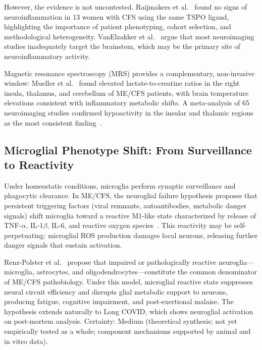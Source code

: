 However, the evidence is not uncontested. Raijmakers et al.~\cite{Raijmakers2021Neuroinflammation} found no signs of neuroinflammation in 13 women with CFS using the same TSPO ligand, highlighting the importance of patient phenotyping, cohort selection, and methodological heterogeneity. VanElzakker et al.~\cite{VanElzakker2019} argue that most neuroimaging studies inadequately target the brainstem, which may be the primary site of neuroinflammatory activity.

Magnetic resonance spectroscopy (MRS) provides a complementary, non-invasive window: Mueller et al.~\cite{Mueller2020MRS} found elevated lactate-to-creatine ratios in the right insula, thalamus, and cerebellum of ME/CFS patients, with brain temperature elevations consistent with inflammatory metabolic shifts. A meta-analysis of 65 neuroimaging studies confirmed hypoactivity in the insular and thalamic regions as the most consistent finding~\cite{Lee2024neuroimaging}.

\subsection{Microglial Phenotype Shift: From Surveillance to Reactivity}

Under homeostatic conditions, microglia perform synaptic surveillance and phagocytic clearance. In ME/CFS, the neuroglial failure hypothesis proposes that persistent triggering factors (viral remnants, autoantibodies, metabolic danger signals) shift microglia toward a reactive M1-like state characterized by release of TNF-$\alpha$, IL-1$\beta$, IL-6, and reactive oxygen species~\cite{RenzPolster2022}. This reactivity may be self-perpetuating: microglial ROS production damages local neurons, releasing further danger signals that sustain activation.

\begin{hypothesis}
\label{hyp:neuroglial-failure}
Renz-Polster et al.~\cite{RenzPolster2022} propose that impaired or pathologically reactive neuroglia---microglia, astrocytes, and oligodendrocytes---constitute the common denominator of ME/CFS pathobiology. Under this model, microglial reactive state suppresses neural circuit efficiency and disrupts glial metabolic support to neurons, producing fatigue, cognitive impairment, and post-exertional malaise. The hypothesis extends naturally to Long COVID, which shows neuroglial activation on post-mortem analysis. Certainty: Medium (theoretical synthesis; not yet empirically tested as a whole; component mechanisms supported by animal and in vitro data).
\end{hypothesis}

